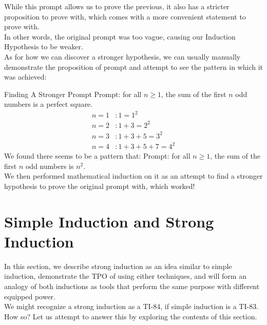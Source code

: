 While this prompt allows us to prove the previous, it also has a stricter proposition to prove with, which comes with a more convenient statement to prove with. \\
In other words, the original prompt was too vague, causing our Induction Hypothesis to be weaker. \\
As for how we can discover a stronger hypothesis, we can usually manually demonstrate the proposition of prompt and attempt to see the pattern in which it was achieved:
\begin{ln-think}{Finding A Stronger Prompt}{}
    Prompt: for all $n \geq 1$, the sum of the first $n$ odd numbers is a perfect square.
    \tcblower
    \begin{align*}
        n = 1 &: 1 = 1^2 \\
        n = 2 &: 1 + 3 = 2^2 \\
        n = 3 &: 1 + 3 + 5 = 3^2 \\
        n = 4 &: 1 + 3 + 5 + 7 = 4^2
    \end{align*}
    We found there seems to be a pattern that: Prompt: for all $n \geq 1$, the sum of the first $n$ odd numbers is $n^2$. \\
    We then performed mathematical induction on it as an attempt to find a stronger hypothesis to prove the original prompt with, which worked!
\end{ln-think}

\section{Simple Induction and Strong Induction}
In this section, we describe strong induction as an idea similar to simple induction, demonstrate the TPO of using either techniques, and will form an analogy of both inductions as tools that perform the same purpose with different equipped power. \\
We might recognize a strong induction as a TI-84, if simple induction is a TI-83. How so? Let us attempt to answer this by exploring the contents of this section.

